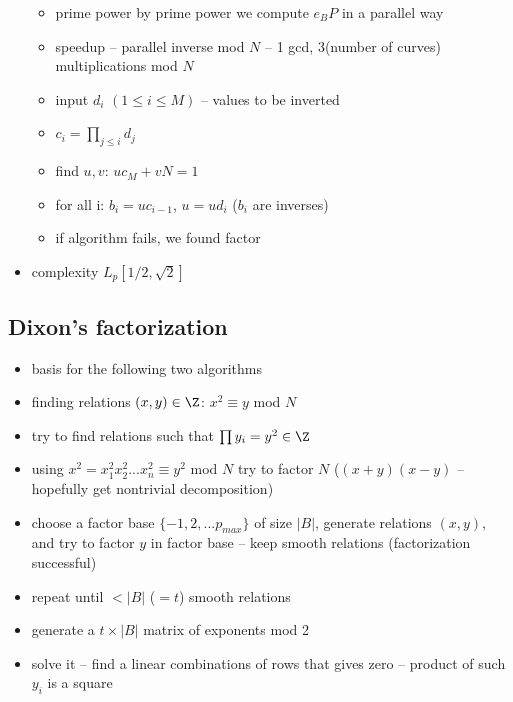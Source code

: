 \begin{itemize}
\begin{itemize}
		\item prime power by prime power we compute $e_BP$ in a parallel way
		\item speedup -- parallel inverse mod $N$ -- 1 gcd, 3(number of curves) multiplications mod $N$
		\item input $d_i$ $(1 \leq i \leq M)$ -- values to be inverted
		\item $c_i = \prod_{j\leq i} d_j$
		\item find $u,v$: $uc_M+vN=1$
		\item for all i: $b_i = uc_{i-1}$, $u = ud_i$ ($b_i$ are inverses)
		\item if algorithm fails, we found factor
	\end{itemize}
	\item complexity $L_p[1/2,\sqrt{2}]$
\end{itemize}

\subsection*{Dixon's factorization}
\begin{itemize}
	\item basis for the following two algorithms
	\item finding relations $(x,y) \in \Z$: $x^2\equiv y$ mod $N$
	\item try to find relations such that $\prod y_i = y^2 \in \Z$
	\item using $x^2=x_1^2x_2^2...x_n^2 \equiv y^2$ mod $N$ try to factor $N$ ($(x+y)(x-y)$ -- hopefully get nontrivial decomposition)
	\item choose a factor base $\{-1,2,...p_{max}\}$ of size $|B|$, generate relations $(x,y)$, and try to factor $y$ in factor base -- keep smooth relations (factorization successful)
	\item repeat until $<|B|$ ($=t$) smooth relations
	\item generate a $t\times |B|$ matrix of exponents mod 2  
	\item solve it -- find a linear combinations of rows that gives zero -- product of such $y_i$ is a square
\end{itemize}


